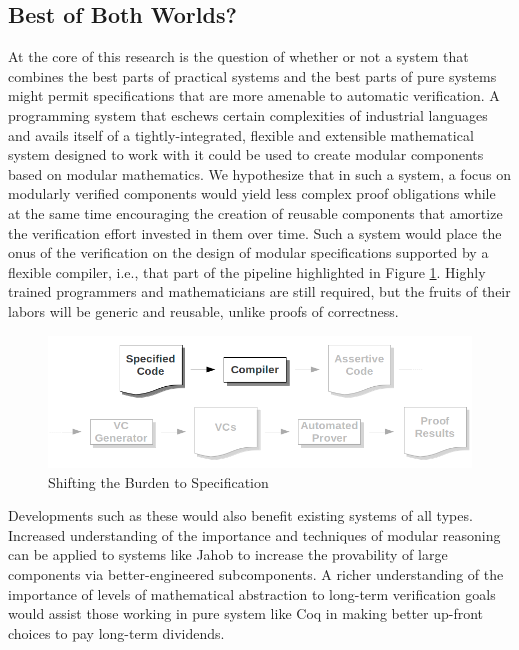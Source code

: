 \subsection{Best of Both Worlds?}
At the core of this research is the question of whether or not a system that combines the best parts of practical systems and the best parts of pure systems might permit specifications that are more amenable to automatic verification.  A programming system that eschews certain complexities of industrial languages and avails itself of a tightly-integrated, flexible and extensible mathematical system designed to work with it could be used to create modular components based on modular mathematics.  We hypothesize that in such a system, a focus on modularly verified components would yield less complex proof obligations while at the same time encouraging the creation of reusable components that amortize the verification effort invested in them over time.  Such a system would place the onus of the verification on the design of modular specifications supported by a flexible compiler, i.e., that part of the pipeline highlighted in Figure \ref{fig:specification}.  Highly trained programmers and mathematicians are still required, but the fruits of their labors will be generic and reusable, unlike proofs of correctness.

\begin{figure}
  \centering
    \includegraphics[width=\textwidth]{specpart}
  \caption{Shifting the Burden to Specification\label{fig:specification}}
\end{figure}

Developments such as these would also benefit existing systems of all types.  Increased understanding of the importance and techniques of modular reasoning can be applied to systems like Jahob to increase the provability of large components via better-engineered subcomponents.  A richer understanding of the importance of levels of mathematical abstraction to long-term verification goals would assist those working in pure system like Coq in making better up-front choices to pay long-term dividends.

